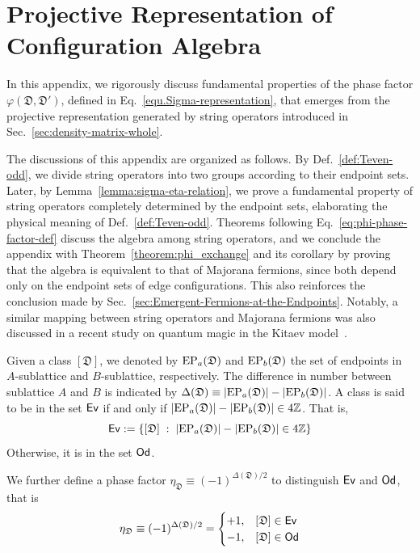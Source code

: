 \section{Projective Representation of Configuration Algebra}\label{appendix:projective-rep}

In this appendix, we rigorously discuss fundamental properties of the phase factor $\varphi(\mathfrak{D},\mathfrak{D}')$, defined in Eq.~\eqref{equ.Sigma-representation}, that emerges from the projective representation generated by string operators introduced in Sec.~\ref{sec:density-matrix-whole}. 

The discussions of this appendix are organized as follows. By Def.~\ref{def:Teven-odd}, we divide string operators into two groups according to their endpoint sets. Later, by Lemma~\ref{lemma:sigma-eta-relation}, we prove a fundamental property of string operators completely determined by the endpoint sets, elaborating the physical meaning of Def.~\ref{def:Teven-odd}. Theorems following Eq.~\eqref{eq:phi-phase-factor-def} discuss the algebra among string operators, and we conclude the appendix with Theorem~\ref{theorem:phi_exchange} and its corollary by proving that the algebra is equivalent to that of Majorana fermions, since both depend only on the endpoint sets of edge configurations. This also reinforces the conclusion made by Sec.~\ref{sec:Emergent-Fermions-at-the-Endpoints}. Notably, a similar mapping between string operators and Majorana fermions was also discussed in a recent study on quantum magic in the Kitaev model~\cite{Lamma-Bauer-Dalmonte-Collura_2026}.

\begin{definition}\label{def:Teven-odd}
  Given a class $[\mathfrak{D}]$, we denoted by $\mathrm{EP}_a(\mathfrak{D})$ and $\mathrm{EP}_b(\mathfrak{D})$  the set of endpoints in $A$-sublattice and $B$-sublattice, respectively. The difference in number between sublattice $A$ and $B$ is indicated by $\Delta(\mathfrak{D}) \equiv \abs{\mathrm{EP}_a(\mathfrak{D})}-\abs{\mathrm{EP}_b(\mathfrak{D})}$. A class is said to be in the set $\mathbf{\mathsf{Ev}}$ if and only if $\abs{\mathrm{EP}_a(\mathfrak{D})}-\abs{\mathrm{EP}_b(\mathfrak{D})} \in 4\mathbb{Z}$. That is,
  \[
  \mathbf{\mathsf{Ev}} := \left\{ [\mathfrak{D}] \; :\; \abs{\mathrm{EP}_a(\mathfrak{D})}-\abs{\mathrm{EP}_b(\mathfrak{D})} \in 4\mathbb{Z} \right\} 
  \]
  Otherwise, it is in the set $\mathbf{\mathsf{Od}}$.
  
  We further define a phase factor $\eta_{\mathfrak{D}} \equiv (-1)^{\Delta(\mathfrak{D})/2}$ to distinguish $\mathbf{\mathsf{Ev}}$ and $\mathbf{\mathsf{Od}}$, that is
  \begin{equation}\label{eq:eta-def}
      \eta_\mathfrak{D}\equiv (-1)^{\Delta(\mathfrak{D})/2} = \begin{cases}
                       +1, & [\mathfrak{D}]\in\mathbf{\mathsf{Ev}} \\
                       -1, & [\mathfrak{D}]\in\mathbf{\mathsf{Od}}
                     \end{cases}
  \end{equation}
\end{definition}

